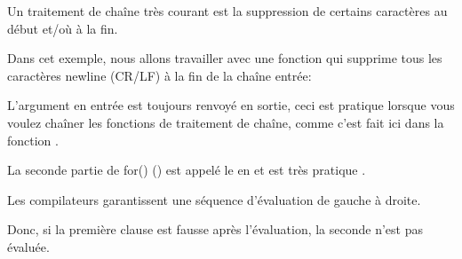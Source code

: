 \newcommand{\CRLF}{\ac{CR}/\ac{LF}}

Un traitement de chaîne très courant est la suppression de certains caractères au
début et/où à la fin.

Dans cet exemple, nous allons travailler avec une fonction qui supprime tous les
caractères newline (\CRLF{}) à la fin de la chaîne entrée:



L'argument en entrée est toujours renvoyé en sortie, ceci est pratique lorsque vous
voulez chaîner les fonctions de traitement de chaîne, comme c'est fait ici dans la
fonction \main.

La seconde partie de for() () est appelé le
 en \CCpp et est très pratique .

Les compilateurs \CCpp garantissent une séquence d'évaluation de gauche à droite.

Donc, si la première clause est fausse après l'évaluation, la seconde n'est pas évaluée.






